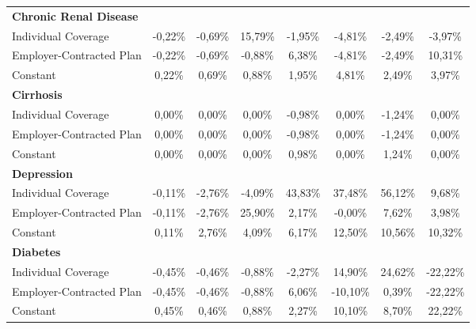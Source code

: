 \documentclass{article}
\begin{document}
\begin{table*}
{\begin{tabular}{l*{7}{c}}
\midrule
\textbf{Chronic Renal Disease}  & & & & & & & \\

Individual Coverage      & -0,22\%         & -0,69\%         & 15,79\%         & -1,95\%\sym{*}  & -4,81\%\sym{**} & -2,49\%\sym{*}  & -3,97\%\sym{*}  \\
Employer-Contracted Plan & -0,22\%         & -0,69\%         & -0,88\%         &  6,38\%         & -4,81\%\sym{**} & -2,49\%\sym{*}  & 10,31\%         \\
Constant                 &  0,22\%         &  0,69\%         &  0,88\%         &  1,95\%\sym{*}  &  4,81\%\sym{**} &  2,49\%\sym{*}  &  3,97\%\sym{*}  \\

\midrule
\textbf{Cirrhosis}  & & & & & & & \\

Individual Coverage      &  0,00\%         &  0,00\%         &  0,00\%         & -0,98\%         &  0,00\%         & -1,24\%         &  0,00\%         \\
Employer-Contracted Plan &  0,00\%         &  0,00\%         &  0,00\%         & -0,98\%         &  0,00\%         & -1,24\%         &  0,00\%         \\
Constant                 &  0,00\%         &  0,00\%         &  0,00\%         &  0,98\%         &  0,00\%         &  1,24\%         &  0,00\%         \\

\midrule
\textbf{Depression}  & & & & & & & \\

Individual Coverage      & -0,11\%         & -2,76\%\sym{***}& -4,09\%\sym{***}& 43,83\%         & 37,48\%         & \cellcolor[gray]{0.9} 56,12\%\sym{*}  &  9,68\%         \\
Employer-Contracted Plan & -0,11\%         & -2,76\%\sym{***}& 25,90\%         &  2,17\%         & -0,00\%         &  7,62\%         &  3,98\%         \\
Constant                 &  0,11\%         &  2,76\%\sym{***}&  4,09\%\sym{***}&  6,17\%\sym{***}& 12,50\%\sym{***}& 10,56\%\sym{***}& 10,32\%\sym{***}\\

\midrule
\textbf{Diabetes}  & & & & & & & \\

Individual Coverage      & -0,45\%\sym{*}  & -0,46\%         & -0,88\%         & -2,27\%\sym{**} & 14,90\%         & 24,62\%         &-22,22\%\sym{***}\\
Employer-Contracted Plan & -0,45\%\sym{*}  & -0,46\%         & -0,88\%         &  6,06\%         &-10,10\%\sym{***}&  0,39\%         &-22,22\%\sym{***}\\
Constant                 &  0,45\%\sym{*}  &  0,46\%         &  0,88\%         &  2,27\%\sym{**} & 10,10\%\sym{***}&  8,70\%\sym{***}& 22,22\%\sym{***}\\


\end{tabular}}
\end{table*}
\end{document}
